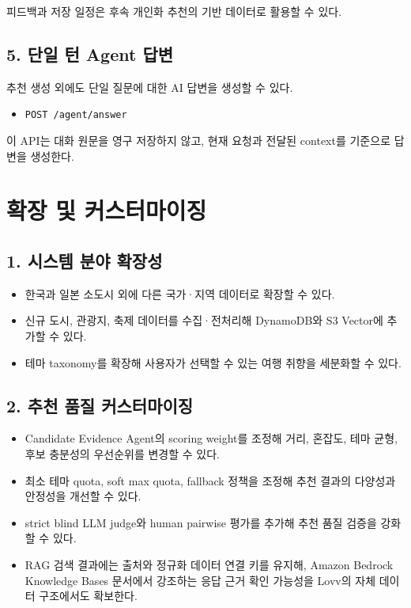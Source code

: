 \documentclass[12pt,a4paper]{article}
\newcommand{\DocNeedspace}[1]{\par\ifdim\dimexpr\pagegoal-\pagetotal\relax<#1\newpage\fi}
\begin{document}
\DocNeedspace{3\baselineskip}
피드백과 저장 일정은 후속 개인화 추천의 기반 데이터로 활용할 수 있다.


\DocNeedspace{3\baselineskip}
\subsection*{5. 단일 턴 Agent 답변}


\DocNeedspace{3\baselineskip}
추천 생성 외에도 단일 질문에 대한 AI 답변을 생성할 수 있다.


\begin{itemize}
\item \texttt{POST /\allowbreak{}agent/\allowbreak{}answer}
\end{itemize}


\DocNeedspace{3\baselineskip}
이 API는 대화 원문을 영구 저장하지 않고, 현재 요청과 전달된 context를 기준으로 답변을 생성한다.


\newpage
\DocNeedspace{10\baselineskip}
\section*{확장 및 커스터마이징}


\DocNeedspace{8\baselineskip}
\subsection*{1. 시스템 분야 확장성}


\begin{itemize}
\item 한국과 일본 소도시 외에 다른 국가·지역 데이터로 확장할 수 있다.
\item 신규 도시, 관광지, 축제 데이터를 수집·전처리해 DynamoDB와 S3 Vector에 추가할 수 있다.
\item 테마 taxonomy를 확장해 사용자가 선택할 수 있는 여행 취향을 세분화할 수 있다.
\end{itemize}


\DocNeedspace{24\baselineskip}
\subsection*{2. 추천 품질 커스터마이징}


\begin{itemize}
\item Candidate Evidence Agent의 scoring weight를 조정해 거리, 혼잡도, 테마 균형, 후보 충분성의 우선순위를 변경할 수 있다.
\item 최소 테마 quota, soft max quota, fallback 정책을 조정해 추천 결과의 다양성과 안정성을 개선할 수 있다.
\item strict blind LLM judge와 human pairwise 평가를 추가해 추천 품질 검증을 강화할 수 있다.
\item RAG 검색 결과에는 출처와 정규화 데이터 연결 키를 유지해, Amazon Bedrock Knowledge Bases 문서에서 강조하는 응답 근거 확인 가능성을 Lovv의 자체 데이터 구조에서도 확보한다.
\end{itemize}
\end{document}
